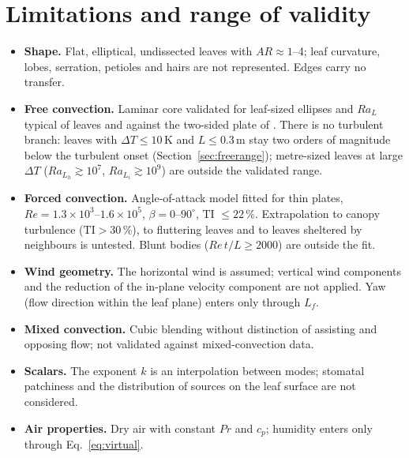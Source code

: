 \documentclass[11pt,a4paper]{article}
\newcommand{\Ra}{\mathit{Ra}}
\newcommand{\Rey}{\mathit{Re}}
\newcommand{\Prn}{\mathit{Pr}}
\begin{document}
\section{Limitations and range of validity}\label{sec:limits}
\begin{itemize}
\item \textbf{Shape.} Flat, elliptical, undissected leaves with $AR\approx1$--4; leaf curvature, lobes, serration, petioles and hairs are not represented. Edges carry no transfer.
\item \textbf{Free convection.} Laminar core validated for leaf-sized ellipses and $\Ra_L$ typical of leaves and against the two-sided plate of \citet{ryms2025}. There is no turbulent branch: leaves with $\Delta T\le10$\,K and $L\le0.3$\,m stay two orders of magnitude below the turbulent onset (Section~\ref{sec:freerange}); metre-sized leaves at large $\Delta T$ ($\Ra_{L_h}\gtrsim10^{7}$, $\Ra_{L_i}\gtrsim10^{9}$) are outside the validated range.
\item \textbf{Forced convection.} Angle-of-attack model fitted for thin plates, $\Rey = \ensuremath{1.3\times10^{3}}$--\ensuremath{1.6\times10^{5}}, $\beta = 0$--$90^\circ$, TI $\le 22\,\%$. Extrapolation to canopy turbulence ($\mathrm{TI} > 30\,\%$), to fluttering leaves and to leaves sheltered by neighbours is untested. Blunt bodies ($\Rey\,t/L\ge2000$) are outside the fit.
\item \textbf{Wind geometry.} The horizontal wind is assumed; vertical wind components and the reduction of the in-plane velocity component are not applied. Yaw (flow direction within the leaf plane) enters only through $L_f$.
\item \textbf{Mixed convection.} Cubic blending without distinction of assisting and opposing flow; not validated against mixed-convection data.
\item \textbf{Scalars.} The exponent $k$ is an interpolation between modes; stomatal patchiness and the distribution of sources on the leaf surface are not considered.
\item \textbf{Air properties.} Dry air with constant $\Prn$ and $c_p$; humidity enters only through Eq.~\eqref{eq:virtual}.
\end{itemize}

\end{document}

